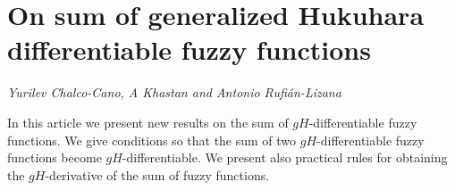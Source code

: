\documentclass[../booklet.tex]{subfiles}
\begin{document}
\section[On sum of generalized Hukuhara differentiable fuzzy functions. {\it Yurilev Chalco-Cano, A Khastan and Antonio Rufián-Lizana}]{On sum of generalized Hukuhara differentiable fuzzy functions}
  

\begin{center}
  {\it Yurilev Chalco-Cano, A Khastan and Antonio Rufián-Lizana}
\end{center}

\vskip 0.8cm


In this article we present new results on the sum of $gH$-differentiable fuzzy functions. We give conditions so that the sum of two $gH$-differentiable fuzzy functions become $gH$-differentiable. We present also practical rules for obtaining the $gH$-derivative of the sum of fuzzy functions. 

\end{document}
